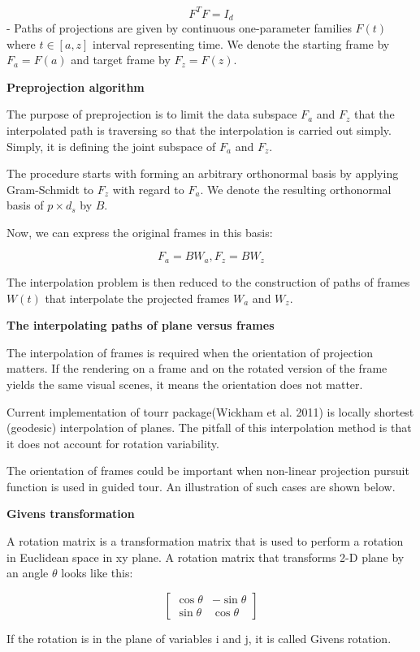 \[F^TF = I_d\]
- Paths of projections are given by continuous one-parameter families \(F(t)\) where \(t\in [a, z]\) interval representing time. We denote the starting frame by \(F_a = F(a)\) and target frame by \(F_z = F(z)\).

\textbf{Preprojection algorithm}

The purpose of preprojection is to limit the data subspace \(F_a\) and \(F_z\) that the interpolated path is traversing so that the interpolation is carried out simply. Simply, it is defining the joint subspace of \(F_a\) and \(F_z\).

The procedure starts with forming an arbitrary orthonormal basis by applying Gram-Schmidt to \(F_z\) with regard to \(F_a\). We denote the resulting orthonormal basis of \(p\times d_s\) by \(B\).

Now, we can express the original frames in this basis:

\[F_a = BW_a, F_z = BW_z\]

The interpolation problem is then reduced to the construction of paths of frames \(W(t)\) that interpolate the projected frames \(W_a\) and \(W_z\).

\textbf{The interpolating paths of plane versus frames}

The interpolation of frames is required when the orientation of projection matters. If the rendering on a frame and on the rotated version of the frame yields the same visual scenes, it means the orientation does not matter.

Current implementation of tourr package(Wickham et al. 2011) is locally shortest (geodesic) interpolation of planes. The pitfall of this interpolation method is that it does not account for rotation variability.

The orientation of frames could be important when non-linear projection pursuit function is used in guided tour. An illustration of such cases are shown below.

\textbf{Givens transformation}

A rotation matrix is a transformation matrix that is used to perform a rotation in Euclidean space in xy plane. A rotation matrix that transforms 2-D plane by an angle \(\theta\) looks like this:

\[ \begin{bmatrix}\cos \theta &-\sin \theta \\\sin \theta &\cos \theta \end{bmatrix} \]

If the rotation is in the plane of variables i and j, it is called Givens rotation.

